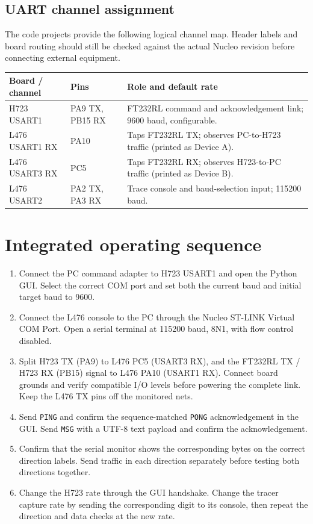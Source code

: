 \documentclass[10pt,a4paper]{article}
\begin{document}
\subsection{UART channel assignment}
The code projects provide the following logical channel map. Header labels and board routing should still be checked against the actual Nucleo revision before connecting external equipment.
\begin{center}
\small
\begin{tabularx}{0.94\linewidth}{@{}l l X@{}}
\toprule
Board / channel & Pins & Role and default rate \\
\midrule
H723 USART1 & PA9 TX, PB15 RX & FT232RL command and acknowledgement link; 9600 baud, configurable. \\
L476 USART1 RX & PA10 & Taps FT232RL TX; observes PC-to-H723 traffic (printed as Device A). \\
L476 USART3 RX & PC5 & Taps FT232RL RX; observes H723-to-PC traffic (printed as Device B). \\
L476 USART2 & PA2 TX, PA3 RX & Trace console and baud-selection input; 115200 baud. \\
\bottomrule
\end{tabularx}
\end{center}

\section{Integrated operating sequence}
\begin{enumerate}
  \item Connect the PC command adapter to H723 USART1 and open the Python GUI. Select the correct COM port and set both the current baud and initial target baud to 9600.
  \item Connect the L476 console to the PC through the Nucleo ST-LINK Virtual COM Port. Open a serial terminal at 115200 baud, 8N1, with flow control disabled.
  \item Split H723 TX (PA9) to L476 PC5 (USART3 RX), and the FT232RL TX / H723 RX (PB15) signal to L476 PA10 (USART1 RX). Connect board grounds and verify compatible I/O levels before powering the complete link. Keep the L476 TX pins off the monitored nets.
  \item Send \texttt{PING} and confirm the sequence-matched \texttt{PONG} acknowledgement in the GUI. Send \texttt{MSG} with a UTF-8 text payload and confirm the acknowledgement.
  \item Confirm that the serial monitor shows the corresponding bytes on the correct direction labels. Send traffic in each direction separately before testing both directions together.
  \item Change the H723 rate through the GUI handshake. Change the tracer capture rate by sending the corresponding digit to its console, then repeat the direction and data checks at the new rate.
\end{enumerate}
\end{document}
